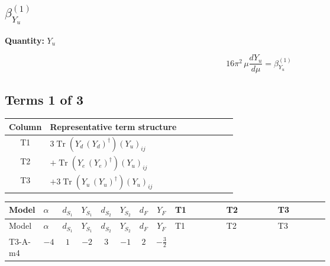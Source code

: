 \documentclass[8pt]{article}
\begin{document}
\begin{landscape}
\section*{$\beta_{Y_u}^{(1)}$}
\noindent\textbf{Quantity: }$Y_u$\par\smallskip
\[16\pi^2\,\mu\frac{d Y_u}{d\mu}=\beta_{Y_u}^{(1)}\]
\subsection*{Terms 1 of 3}
\begin{center}
\begin{tabular}{@{}c >{\raggedright\arraybackslash}p{0.82\linewidth}@{}}
\toprule
Column & Representative term structure \\
\midrule
T1 & \(\displaystyle 3 \operatorname{Tr}\!\left({Y_d}\,\left({Y_d}\right)^{\dagger}\right) \left({Y_u}\right)_{ij}\) \\
\midrule
T2 & \(\displaystyle +\operatorname{Tr}\!\left({Y_e}\,\left({Y_e}\right)^{\dagger}\right) \left({Y_u}\right)_{ij}\) \\
\midrule
T3 & \(\displaystyle +3 \operatorname{Tr}\!\left({Y_u}\,\left({Y_u}\right)^{\dagger}\right) \left({Y_u}\right)_{ij}\) \\
\midrule
\bottomrule
\end{tabular}
\end{center}
\smallskip
\tiny
\begin{longtable}{@{}llcccccc >{\raggedright\arraybackslash}p{0.21\linewidth} >{\raggedright\arraybackslash}p{0.21\linewidth} >{\raggedright\arraybackslash}p{0.21\linewidth}@{}}
\toprule
Model & $\alpha$ & $d_{S_1}$ & $Y_{S_1}$ & $d_{S_2}$ & $Y_{S_2}$ & $d_F$ & $Y_F$ & T1 & T2 & T3 \\
\midrule
\endfirsthead
\toprule
Model & $\alpha$ & $d_{S_1}$ & $Y_{S_1}$ & $d_{S_2}$ & $Y_{S_2}$ & $d_F$ & $Y_F$ & T1 & T2 & T3 \\
\midrule
\endhead
T3-A-m4 & $-4$ & $1$ & $-2$ & $3$ & $-1$ & $2$ & $-\frac{3}{2}$ & \scriptsize\adjustbox{max width=\linewidth}{$\begin{gathered} 3 \operatorname{Tr}\!\left({Y_d}\,\left({Y_d}\right)^{\dagger}\right) \left({Y_u}\right)_{ij}\end{gathered}$} & \scriptsize\adjustbox{max width=\linewidth}{$\begin{gathered} +\operatorname{Tr}\!\left({Y_e}\,\left({Y_e}\right)^{\dagger}\right) \left({Y_u}\right)_{ij}\end{gathered}$} & \scriptsize\adjustbox{max width=\linewidth}{$\begin{gathered} +3 \operatorname{Tr}\!\left({Y_u}\,\left({Y_u}\right)^{\dagger}\right) \left({Y_u}\right)_{ij}\end{gathered}$} \\

\end{longtable}
\end{landscape}
\end{document}
